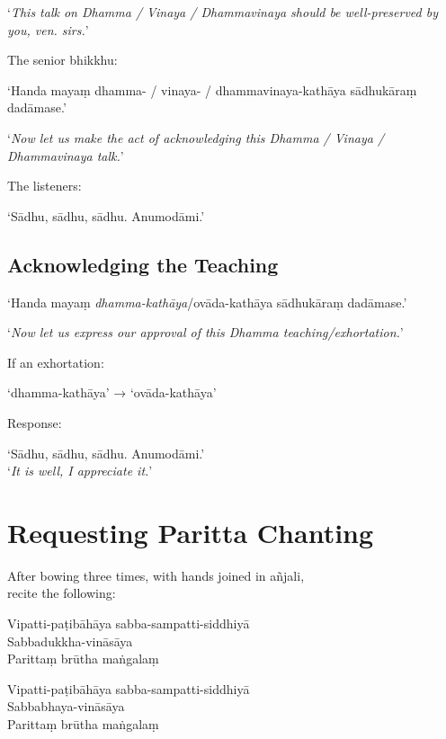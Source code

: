‘\emph{This talk on Dhamma / Vinaya / Dhammavinaya should be well-preserved by you, ven. sirs.}’

The senior bhikkhu:

‘Handa mayaṃ dhamma- / vinaya- / dhammavinaya-kathāya sādhukāraṃ dadāmase.’

‘\emph{Now let us make the act of acknowledging this Dhamma / Vinaya / Dhammavinaya talk.}’

\ifhandbookedition
\enlargethispage{\baselineskip}
\fi

The listeners:

‘Sādhu, sādhu, sādhu. Anumodāmi.’

\subsection{Acknowledging the Teaching}

‘Handa mayaṃ \emph{dhamma-kathāya}/ovāda-kathāya sādhukāraṃ dadāmase.’

‘\emph{Now let us express our approval of this Dhamma teaching/exhortation.}’

If an exhortation:

‘dhamma-kathāya’ → ‘ovāda-kathāya’

Response:

‘Sādhu, sādhu, sādhu. Anumodāmi.’\\
‘\emph{It is well, I appreciate it.}’

\ifhandbookedition
\clearpage
\fi


\section{Requesting Paritta Chanting}

\begin{instruction}
  After bowing three times, with hands joined in añjali,\\
  recite the following:
\end{instruction}

Vipatti-paṭibāhāya sabba-sampatti-siddhiyā\\
Sabbadukkha-vināsāya\\
Parittaṃ brūtha maṅgalaṃ

Vipatti-paṭibāhāya sabba-sampatti-siddhiyā\\
Sabbabhaya-vināsāya\\
Parittaṃ brūtha maṅgalaṃ

